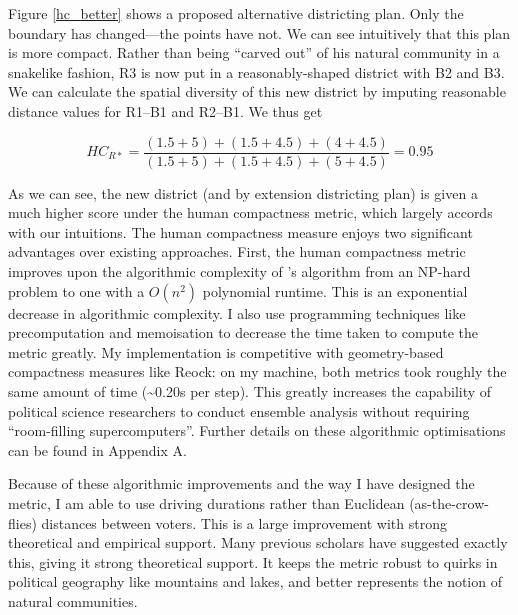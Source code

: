 \documentclass[]{article}
\begin{document}
Figure \ref{hc_better} shows a proposed alternative districting plan.
Only the boundary has changed---the points have not. We can see
intuitively that this plan is more compact. Rather than being ``carved
out'' of his natural community in a snakelike fashion, R3 is now put in
a reasonably-shaped district with B2 and B3. We can calculate the
spatial diversity of this new district by imputing reasonable distance
values for R1--B1 and R2--B1. We thus get

\[HC_{R*} = \frac{(1.5 + 5) + (1.5+4.5) + (4 + 4.5)}{(1.5+5) + (1.5+4.5) + (5+4.5)} = 0.95\]

As we can see, the new district (and by extension districting plan) is
given a much higher score under the human compactness metric, which
largely accords with our intuitions. The human compactness measure
enjoys two significant advantages over existing approaches. First, the
human compactness metric improves upon the algorithmic complexity of
\citeauthor{fh2011}'s algorithm from an NP-hard problem to one with a
\(O(n^2)\) polynomial runtime. This is an exponential decrease in
algorithmic complexity. I also use programming techniques like
precomputation and memoisation to decrease the time taken to compute the
metric greatly. My implementation is competitive with geometry-based
compactness measures like Reock: on my machine, both metrics took
roughly the same amount of time (\textasciitilde{}0.20s per step). This
greatly increases the capability of political science researchers to
conduct ensemble analysis without requiring ``room-filling
supercomputers''. Further details on these algorithmic optimisations can
be found in Appendix A.

Because of these algorithmic improvements and the way I have designed
the metric, I am able to use driving durations rather than Euclidean
(as-the-crow-flies) distances between voters. This is a large
improvement with strong theoretical and empirical support. Many previous
scholars have suggested exactly this, giving it strong theoretical
support. It keeps the metric robust to quirks in political geography
like mountains and lakes, and better represents the notion of natural
communities.
\end{document}
